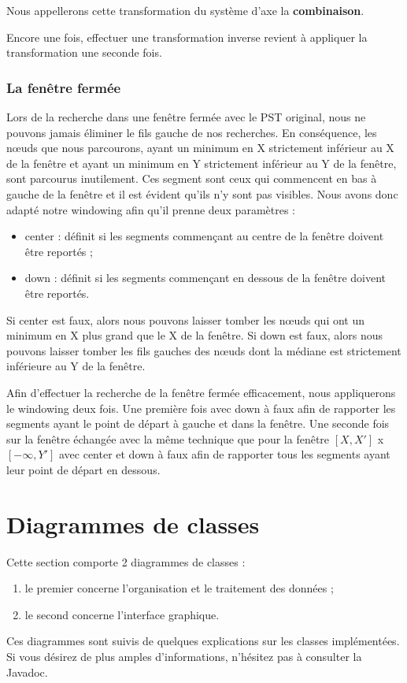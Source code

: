 \documentclass[10pt,a4paper]{article}
\begin{document}
Nous appellerons cette transformation du système d'axe la \textbf{combinaison}.

Encore une fois, effectuer une transformation inverse revient à appliquer la transformation une seconde fois.

\subsubsection{La fenêtre fermée}
Lors de la recherche dans une fenêtre fermée avec le PST original, nous ne pouvons jamais éliminer le fils gauche de nos recherches. En conséquence, les nœuds que nous parcourons, ayant un minimum en X strictement inférieur au X de la fenêtre et ayant un minimum en Y strictement inférieur au Y de la fenêtre, sont parcourus inutilement. Ces segment sont ceux qui commencent en bas à gauche de la fenêtre et il est évident qu'ils n'y sont pas visibles. Nous avons donc adapté notre windowing afin qu'il prenne deux paramètres :
\begin{itemize}
	\item center : définit si les segments commençant au centre de la fenêtre doivent être reportés ;
	\item down : définit si les segments commençant en dessous de la fenêtre doivent être reportés.
\end{itemize}
Si center est faux, alors nous pouvons laisser tomber les nœuds qui ont un minimum en X plus grand que le X de la fenêtre.
Si down est faux, alors nous pouvons laisser tomber les fils gauches des nœuds dont la médiane est strictement inférieure au Y de la fenêtre.

Afin d'effectuer la recherche de la fenêtre fermée efficacement, nous appliquerons le windowing deux fois. Une première fois avec down à faux afin de rapporter les segments ayant le point de départ à gauche et dans la fenêtre. Une seconde fois sur la fenêtre échangée avec la même technique que pour la fenêtre $[X, X']$ x $[-\infty, Y']$ avec center et down à faux afin de rapporter tous les segments ayant leur point de départ en dessous.

\newpage
\section{Diagrammes de classes}
Cette section comporte 2 diagrammes de classes :
\begin{enumerate}
	\item le premier concerne l'organisation et le traitement des données ;
	\item le second concerne l'interface graphique.
\end{enumerate}
Ces diagrammes sont suivis de quelques explications sur les classes implémentées. Si vous désirez de plus amples d'informations, n'hésitez pas à consulter la Javadoc.
\end{document}
